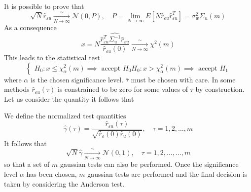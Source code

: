 \documentclass{book}
\begin{document}
It is possible to prove that 
\[
    \sqrt{N}\hat{r}_{\varepsilon u}\xrightarrow[N\to\infty] \sim \mathcal{N}(0,P), \quad P= \lim_{N\to\infty}E[N\hat{r}_{\varepsilon u}\hat{r}_{\varepsilon u}^T]=\sigma_w^2\Sigma_u(m)
\]
As a consequence
\[
    x=N\displaystyle\frac{\hat{r}_{\varepsilon u}^T\hat{\Sigma_u^{-1}}\hat{r}_{\varepsilon u}}{\hat{r}_{\varepsilon u}(0)}\xrightarrow[N\to\infty]\sim\chi^2(m)
\]
This leads to the statistical test
\[
    \begin{cases}
        H_0 : x \leq \chi^2_\alpha(m) \implies \text{ accept } H_0
        H_0 : x >\chi^2_\alpha(m) \implies \text{ accept } H_1
    \end{cases}
\]
where $\alpha$ is the chosen significance level. $\bar{\tau}$ must be chosen with care. In some methods  $\hat{r}_{\varepsilon u}(\tau)$ is constrained to be zero for some values of $\tau$ by construction.
Let us consider the quantity 
it follows that 

We define the normalized test quantities 
\[
    \hat{\gamma}(\tau) = \displaystyle\frac{\hat{r}_{\varepsilon u}(\tau)}{\sqrt{\hat{r}_\varepsilon(0)\hat{r}_u(0)}}, \quad \tau=1,2,\dots,m 
\]
It follows that 
\[
    \sqrt{N}\hat{\gamma}\xrightarrow[N\to\infty]\sim \mathcal{N}(0,1), \quad \tau = 1,2,\dots,\dots,m  
\]
so that a set of $m$ gaussian tests can also be performed. Once the significance level $\alpha$ has been chosen, $m$ gaussian tests are performed and the final decision is taken by considering the Anderson test.
\end{document}
